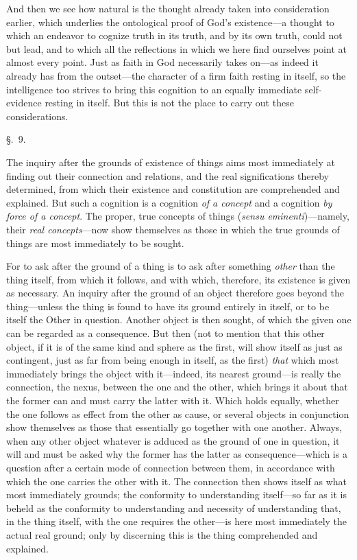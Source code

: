 \documentclass[12pt,a4paper]{book}
\begin{document}
And then we see how natural is the thought already taken into consideration
earlier, which underlies the ontological proof of God's existence---a thought to
which an endeavor to cognize truth in its truth, and by its own truth, could not
but lead, and to which all the reflections in which we here find ourselves point
at almost every point. Just as faith in God necessarily takes on---as indeed it
already has from the outset---the character of a firm faith resting in itself, so
the intelligence too strives to bring this cognition to an equally immediate
self-evidence resting in itself. But this is not the place to carry out these
considerations.

\begin{center}\large\S.~9.\end{center}
The inquiry after the grounds of existence of things aims most immediately at
finding out their connection and relations, and the real significations thereby
determined, from which their existence and constitution are comprehended and
explained. But such a cognition is a cognition \emph{of a concept} and a cognition
\emph{by force of a concept}. The proper, true concepts of things
(\textit{sensu eminenti})---namely, their \emph{real concepts}---now show
themselves as those in which the true grounds of things are most immediately to be
sought.

For to ask after the ground of a thing is to ask after something \emph{other} than
the thing itself, from which it follows, and with which, therefore, its existence
is given as necessary. An inquiry after the ground of an object therefore goes
beyond the thing---unless the thing is found to have its ground entirely in
itself, or to be itself the Other in question. Another object is then sought, of
which the given one can be regarded as a consequence. But then (not to mention
that this other object, if it is of the same kind and sphere as the first, will
show itself as just as contingent, just as far from being enough in itself, as the
first) \emph{that} which most immediately brings the object with it---indeed, its nearest
ground---is really the connection, the nexus, between the one and the other, which
brings it about that the former can and must carry the latter with it. Which holds
equally, whether the one follows as effect from the other as cause, or several
objects in conjunction show themselves as those that essentially go together with
one another. Always, when any other object whatever is adduced as the ground of one
in question, it will and must be asked why the former has the latter as
consequence---which is a question after a certain mode of connection between them,
in accordance with which the one carries the other with it. The connection then
shows itself as what most immediately grounds; the conformity to understanding
itself---so far as it is beheld as the conformity to understanding and necessity of
understanding that, in the thing itself, with the one requires the other---is here
most immediately the actual real ground; only by discerning this is the thing
comprehended and explained.
\end{document}
